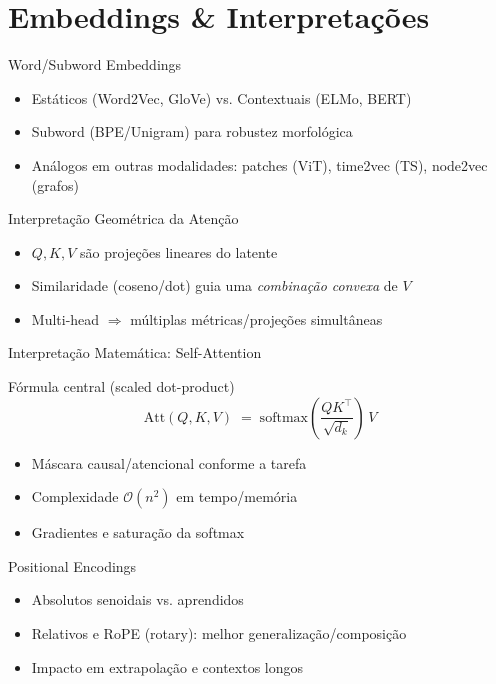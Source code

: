 \documentclass{beamer}
\begin{document}
\section{Embeddings \& Interpretações}
\begin{frame}{Word/Subword Embeddings}
\begin{itemize}[<+->]
  \item Estáticos (Word2Vec, GloVe) vs. Contextuais (ELMo, BERT)
  \item Subword (BPE/Unigram) para robustez morfológica
  \item Análogos em outras modalidades: patches (ViT), time2vec (TS), node2vec (grafos)
\end{itemize}
\end{frame}

\begin{frame}{Interpretação Geométrica da Atenção}
\begin{itemize}[<+->]
  \item $Q,K,V$ são projeções lineares do latente
  \item Similaridade (coseno/dot) guia uma \emph{combinação convexa} de $V$
  \item Multi-head $\Rightarrow$ múltiplas métricas/projeções simultâneas
\end{itemize}
\end{frame}

\begin{frame}{Interpretação Matemática: Self-Attention}
\begin{block}{Fórmula central (scaled dot-product)}
\[
\mathrm{Att}(Q,K,V) \;=\; \mathrm{softmax}\!\left(\frac{QK^\top}{\sqrt{d_k}}\right)\,V
\]
\end{block}
\begin{itemize}[<+->]
  \item Máscara causal/atencional conforme a tarefa
  \item Complexidade $\mathcal{O}(n^2)$ em tempo/memória
  \item Gradientes e saturação da softmax
\end{itemize}
\end{frame}

\begin{frame}{Positional Encodings}
\begin{itemize}[<+->]
  \item Absolutos senoidais vs. aprendidos
  \item Relativos e RoPE (rotary): melhor generalização/composição
  \item Impacto em extrapolação e contextos longos
\end{itemize}
\end{frame}
\end{document}
